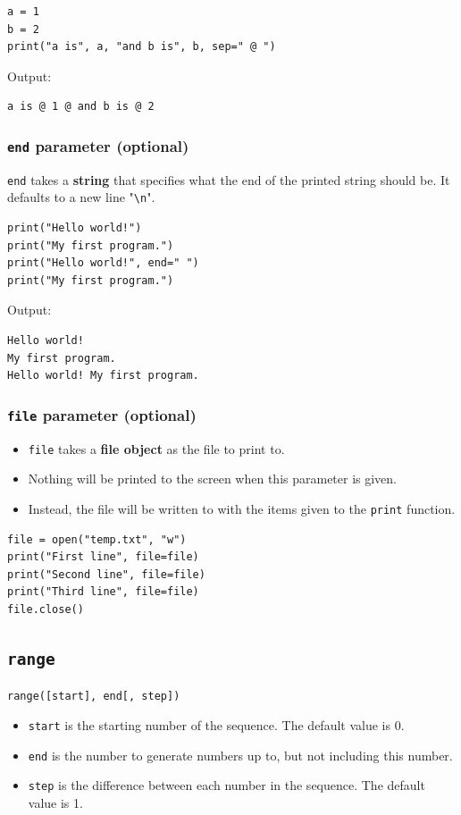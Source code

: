 \documentclass[11pt]{article}
\begin{document}
\begin{verbatim}
a = 1
b = 2
print("a is", a, "and b is", b, sep=" @ ")
\end{verbatim}

 \noindent Output:

\begin{verbatim}
a is @ 1 @ and b is @ 2
\end{verbatim}

\subsubsection{\texttt{end} parameter (optional)}
\label{sec:org374b3f7}
\texttt{end} takes a \textbf{string} that specifies what the end of the printed string should be. It defaults to a new line "\texttt{\textbackslash{}n}".

\begin{verbatim}
print("Hello world!")
print("My first program.")
print("Hello world!", end=" ")
print("My first program.")
\end{verbatim}

 \noindent Output:

\begin{verbatim}
Hello world!
My first program.
Hello world! My first program.
\end{verbatim}

\subsubsection{\texttt{file} parameter (optional)}
\label{sec:orgbd90977}
\begin{itemize}
\item \texttt{file} takes a \textbf{file object} as the file to print to.
\item Nothing will be printed to the screen when this parameter is given.
\item Instead, the file will be written to with the items given to the \texttt{print} function.
\end{itemize}
\begin{verbatim}
file = open("temp.txt", "w")
print("First line", file=file)
print("Second line", file=file)
print("Third line", file=file)
file.close()
\end{verbatim}

\subsection{\texttt{range}}
\label{sec:orgd93c527}
\texttt{range([start], end[, step])}
\begin{itemize}
\item \texttt{start} is the starting number of the sequence. The default value is 0.
\item \texttt{end} is the number to generate numbers up to, but not including this number.
\item \texttt{step} is the difference between each number in the sequence. The default value is 1.
\end{itemize}
\end{document}
